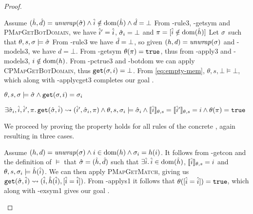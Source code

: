 \begin{proof}

\begin{hypvlist}
 Assume $(\hat{h},\hat{d})={\operatorname{\mathit{unwrap}}}(\hat{\sigma}) \land \hat{i}\notin \operatorname{dom}(\hat{h}) \land \hat{d}=\bot$
 From \hyp{rule3}, \hyp{getsym} and \textsc{PMapGetBotDomain}, we have $\hat{i}'=\hat{i}$, $\hat{\sigma}_i=\bot$ and ${\pi=[\hat{i}\notin \operatorname{dom}(\hat{h})]}$
 Let $\sigma$ such that $\theta,s,\sigma\models\hat{\sigma}$
 From \hyp{rule3} we have $\hat{d}=\bot$, so given $(h,d)={\operatorname{\mathit{unwrap}}}(\sigma)$ and \hyp{models3}, we have $d=\bot$.%
 From \hyp{getsym} $\theta(\pi)=\texttt{true}$, thus from \hyp{apply3} and \hyp{models3}, $i\notin \operatorname{dom}(h)$.
 From \hyp{pctrue3} and \hyp{botdom} we can apply \textsc{CPMapGetBotDomain}, thus ${\texttt{get}(\sigma,i)=\bot}$.%
 From \ref{eq:empty-mem}, $\theta,s,\bot\models\bot$, which along with \hyp{applycget3} completes our goal .
\end{hypvlist}


\pfassume \begin{hypvlist}
 $\theta,s,\sigma \models \hat{\sigma} \land \texttt{get}(\sigma, i)=\sigma_i$
\end{hypvlist}
\pfprove \begin{goalvlist}
 $\exists \hat{\sigma}_i, \hat{i}, \hat{i}', \pi \ldotp \texttt{get}(\hat{\sigma},\hat{i})\rightsquigarrow(\hat{i}', \hat{\sigma}_i, \pi) \land \theta,s,\sigma_i\models\hat{\sigma}_i \land \llbracket\hat{i}\rrbracket_{\theta,s}=\llbracket\hat{i}'\rrbracket_{\theta,s}=i \land \theta(\pi)=\texttt{true}$
\end{goalvlist}

We proceed by proving the property holds for all rules of the concrete , again resulting in three cases.


\begin{hypvlist}
 Assume $(h,d)={\operatorname{\mathit{unwrap}}}(\sigma) \land i\in\operatorname{dom}(h) \land \sigma_{i}=h(i)$.
 It follows from \hyp{getcon} and the definition of $\models$ that $\hat{\sigma}=(\hat{h}, \hat{d})$ such that $\exists \hat{i}\ldotp \hat{i} \in \operatorname{dom}(\hat{h})$, $\llbracket\hat{i}\rrbracket_{\theta,s}=i$ and $\theta,s,\sigma_i\models \hat{h}(\hat{i})$.
 We can then apply \textsc{PMapGetMatch}, giving us $\texttt{get}(\hat{\sigma},\hat{i})\rightsquigarrow(\hat{i}, \hat{h}(\hat{i}), [\hat{i} = \hat{i}])$.
 From \hyp{applys1} it follows that $\theta([\hat{i}=\hat{i}])=\texttt{true}$, which along with \hyp{exsym1} gives our goal .
\end{hypvlist}


\end{proof}
